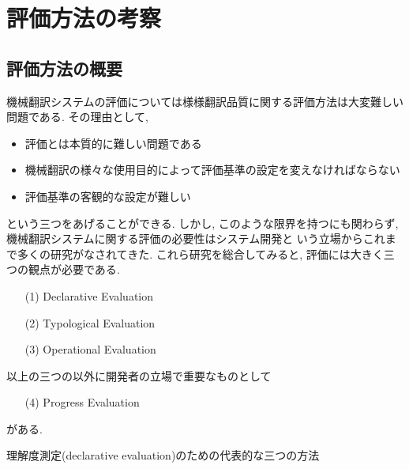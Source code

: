 \section{評価方法の考察}
\subsection{評価方法の概要}
機械翻訳システムの評価については様様翻訳品質に関する評価方法は大変難しい問題である\cite{king}. その理由として, 

\vspace{0.5cm}

\begin{itemize}
\item 評価とは本質的に難しい問題である
\item 機械翻訳の様々な使用目的によって評価基準の設定を変えなければならない
\item 評価基準の客観的な設定が難しい
\end{itemize}

\vspace{0.5cm}

という三つをあげることができる. しかし, このような限界を持つにも関わらず, 機械翻訳システムに関する評価の必要性はシステム開発と
いう立場からこれまで多くの研究がなされてきた. これら研究を総合してみると, 評価には大きく三つの観点が必要である\cite{arnold}. 

\vspace{0.5cm}

\begin{itemize}
\item[(1)] Declarative Evaluation
\item[(2)] Typological Evaluation
\item[(3)] Operational Evaluation
\end{itemize}

\vspace{0.3cm}

以上の三つの以外に開発者の立場で重要なものとして

\vspace{0.3cm}

\begin{itemize}
\item[(4)] Progress Evaluation
\end{itemize}

\vspace{0.3cm}

がある. 

\begin{table}
\begin{center}
\caption{\label{declevalmethod} 理解度測定(declarative evaluation)のための代表的な三つの方法}
\end{center}
\end{table}

